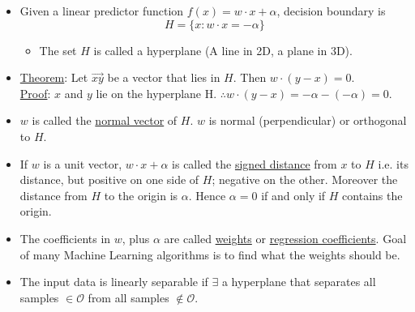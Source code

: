 \documentclass[10pt]{article}
\begin{document}
\begin{itemize}
    		
    		\item Given a linear predictor function $f(x) = w \cdot x + \alpha$, decision boundary is
				$$ H = \{ x : w \cdot x = - \alpha \} $$
				\begin{itemize}
					\item The set $H$ is called a hyperplane (A line in 2D, a plane in 3D).
				\end{itemize}
				
			\item \underline{Theorem}: Let $\vec{xy}$ be a vector that lies in $H$. Then $w \cdot (y - x) = 0$. \\
				\underline{Proof}: $x$ and $y$ lie on the hyperplane H. $\therefore w \cdot (y - x) = -\alpha - (-\alpha) = 0$.
				
			\item $w$ is called the \underline{normal vector} of $H$. $w$ is normal (perpendicular) or orthogonal to $H$.

			\item If $w$ is a unit vector, $w \cdot x + \alpha$ is called the \underline{signed distance} from $x$ to $H$ i.e. its distance, but positive on one side of $H$; negative on the other. Moreover the distance from $H$ to the origin is $\alpha$. Hence $\alpha = 0$ if and only if $H$ contains the origin.
			
			\item The coefficients in $w$, plus $\alpha$ are called \underline{weights} or \underline{regression coefficients}. Goal of many Machine Learning algorithms is to find what the weights should be.
			
			\item The input data is linearly separable if $\exists$ a hyperplane that separates all samples $\in \mathcal{O}$ from all samples $\notin \mathcal{O}$.
			\end{itemize}

\end{document}
